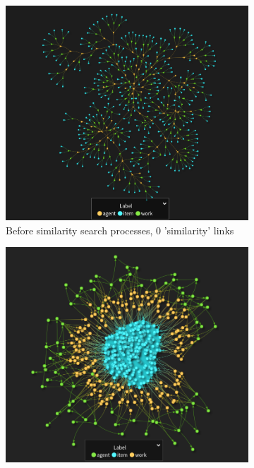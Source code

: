 \documentclass{article}
\begin{document}
\begin{figure}[H]
    \centering
    \captionsetup{justification=centering, size=scriptsize}
    \begin{subfigure}{0.45\textwidth}
        \includegraphics[width=1\textwidth]{larger_graph_before_processing.png}
        \caption{Before similarity search processes, 0 'similarity' links}
        \label{fig:larger-before-processes}
    \end{subfigure}
    \begin{subfigure}{0.45\textwidth}
        \includegraphics[width=1\textwidth]{larger_graph_after_processing.png}

\end{subfigure}
\end{figure}
\end{document}
